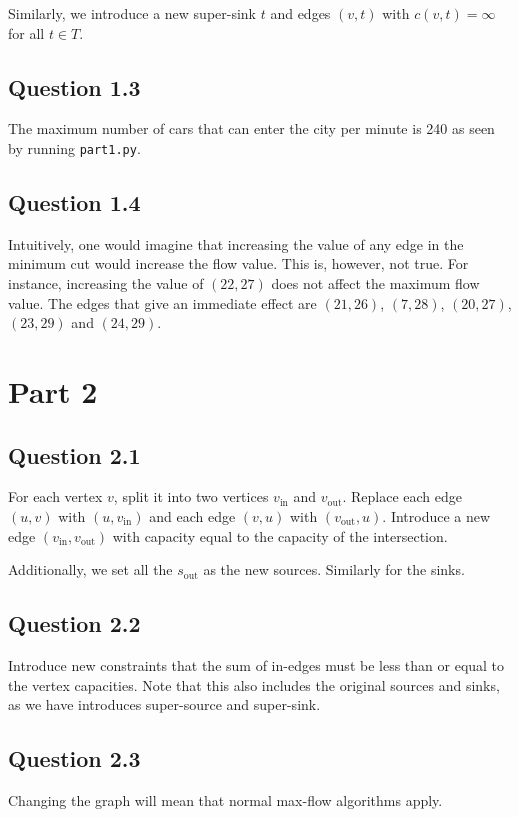 \documentclass{sig-alternate}
\begin{document}
Similarly, we introduce a new super-sink $t$ and edges $(v, t)$ with
$c(v,t)=\infty$ for all $t \in T$.


\subsection*{Question 1.3}

The maximum number of cars that can enter the city per minute is 240 as seen
by running \verb+part1.py+.

\subsection*{Question 1.4}

Intuitively, one would imagine that increasing the value of any edge in the
minimum cut would increase the flow value. This is, however, not true. For
instance, increasing the value of $(22, 27)$ does not affect the maximum flow
value. The edges that give an immediate effect are $(21, 26)$, $(7, 28)$,
$(20, 27)$, $(23, 29)$ and $(24, 29)$.

\section{Part 2}
\subsection*{Question 2.1}
For each vertex $v$, split it into two vertices $v_{\text{in}}$ and
$v_{\text{out}}$. Replace each edge $(u, v)$ with $(u, v_{\text{in}})$
and each edge $(v, u)$ with $(v_{\text{out}}, u)$. Introduce a new edge
$(v_{\text{in}}, v_{\text{out}})$ with capacity equal to the capacity of
the intersection.

Additionally, we set all the $s_{\text{out}}$ as the new sources. Similarly
for the sinks.

\subsection*{Question 2.2}
Introduce new constraints that the sum of in-edges must be less than or equal
to the vertex capacities. Note that this also includes the original sources and
sinks, as we have introduces super-source and super-sink.

\subsection*{Question 2.3}
Changing the graph will mean that normal max-flow algorithms apply.
\end{document}
